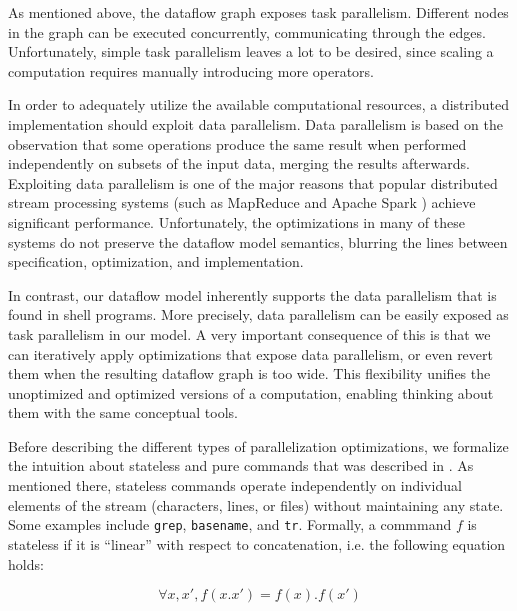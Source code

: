 \documentclass[sigplan,10pt,review,anonymous]{acmart}
\newcommand{\ttt}[1]{\texttt{\small #1}}
\newcommand{\nv}[1]{[{\color{cyan}#1 --- nv}]}
\newcommand{\tr}[1]{} %
\begin{document}
As mentioned above, the dataflow graph exposes task
parallelism. Different nodes in the graph can be executed
concurrently, communicating through the edges.
Unfortunately, simple task parallelism leaves a lot to be desired,
since scaling a computation requires manually introducing more
operators.

In order to adequately utilize the available computational resources,
a distributed implementation should exploit data parallelism. Data
parallelism is based on the observation that some operations produce
the same result when performed independently on subsets of the input
data, merging the results afterwards. Exploiting data parallelism is
one of the major reasons that popular distributed stream processing
systems (such as MapReduce \cite{mapreduce:08} and Apache Spark
\cite{spark:12}) achieve significant performance. Unfortunately, the
optimizations in many of these systems do not preserve the dataflow
model semantics, blurring the lines between specification,
optimization, and implementation.

In contrast, our dataflow model inherently supports the data
parallelism that is found in shell programs. More precisely, data
parallelism can be easily exposed as task parallelism in our model. A
very important consequence of this is that we can iteratively apply
optimizations that expose data parallelism, or even revert them when
the resulting dataflow graph is too wide. This flexibility unifies the
unoptimized and optimized versions of a computation, enabling thinking
about them with the same conceptual tools.

Before describing the different types of parallelization
optimizations, we formalize the intuition about stateless and pure
commands that was described in .
%
As mentioned there, stateless commands operate independently on
individual elements of the stream (characters, lines, or files)
without maintaining any state. Some examples include \ttt{grep},
\ttt{basename}, and \ttt{tr}. Formally, a commmand $f$ is stateless if
it is ``linear'' with respect to concatenation, i.e. the following
equation holds:

\[
\forall x, x', f(x.x') = f(x).f(x')
\]

\tr{This is a nice characterization, which I think is true in most
  settings. There is a caveat though: You can have stateless programs
  that emit output when they start (before they consume the stream)
  and/or when they consume the EOF symbol. In this case I am not sure
  the equation above holds.}
\end{document}
